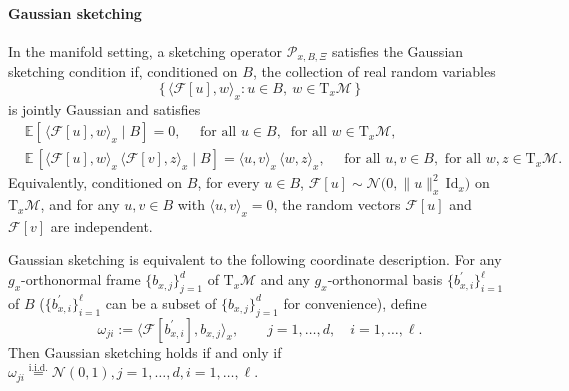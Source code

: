 \documentclass[final,onefignum,onetabnum]{siamart250211}
\begin{document}
\paragraph{Gaussian sketching} In the manifold setting, a sketching operator $\mathcal{P}_{x, B, \Xi}$ satisfies the Gaussian sketching condition if, conditioned on $B$, the collection of real random variables
\[
\big\{\,\langle \mathcal F[u],w\rangle_x : u \in B, \ w\in\mathrm T_x\mathcal M\,\big\}
\]
is jointly Gaussian and satisfies
\begin{equation}
  \label{eq:gaussian-sketching-condition}
\begin{aligned}
& \mathbb E\left[\,\langle \mathcal F[u],w\rangle_x \mid B\right]=0, \quad \text{ for all } u \in B,\ \text{ for all } w\in\mathrm T_x\mathcal M, \\
& \mathbb E\,\left[\langle \mathcal F[u],w\rangle_x\,\langle \mathcal F[v],z\rangle_x \mid B\right]
=\langle u,v\rangle_x\,\langle w,z\rangle_x,
\quad \text{ for all } u,v \in B, \text{ for all } w,z\in\mathrm T_x\mathcal M.
\end{aligned}
\end{equation}
Equivalently, conditioned on $B$, for every $u\in B$, $\mathcal F[u] \sim \mathcal N\big(0, \|u\|_x^{2}\,\mathrm{Id}_x\big)$ on $\mathrm T_x\mathcal M$, and for any $u,v\in B$ with $\langle u,v\rangle_x=0$, the random vectors $\mathcal F[u]$ and $\mathcal F[v]$ are independent.


Gaussian sketching is equivalent to the following coordinate description.
For any $g_x$-orthonormal frame $\{b_{x, j}\}_{j=1}^d$ of $\mathrm T_x\mathcal M$ and any $g_x$-orthonormal basis $\{b^\prime_{x, i}\}_{i=1}^{\ell}$ of $B$ ($\{b^\prime_{x, i}\}_{i=1}^{\ell}$ can be a subset of $\{b_{x, j}\}_{j=1}^d$ for convenience), define
\[
\omega_{ji}:=\langle \mathcal F[b^\prime_{x, i}],b_{x, j}\rangle_x,
\qquad j=1,\dots,d,\quad i=1,\dots,\ell.
\]
Then Gaussian sketching holds if and only if
$
\omega_{ji}\stackrel{\mathrm{i.i.d.}}{=}\mathcal N(0,1),
j=1,\dots,d, i=1,\dots,\ell.
$
\end{document}
